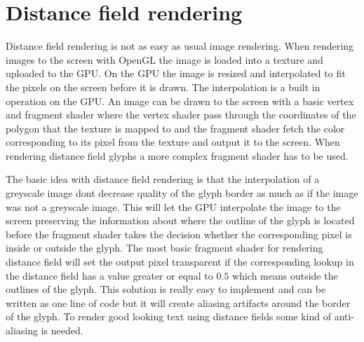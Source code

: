 \section{Distance field rendering}
Distance field rendering is not as easy as usual image rendering. When rendering images to the screen with OpenGL the image is loaded into a texture and uploaded to the GPU. On the GPU the image is resized and interpolated to fit the pixels on the screen before it is drawn. The interpolation is a built in operation on the GPU. An image can be drawn to the screen with a basic vertex and fragment shader where the vertex shader pass through the coordinates of the polygon that the texture is mapped to and the fragment shader fetch the color corresponding to its pixel from the texture and output it to the screen. When rendering distance field glyphs a more complex fragment shader has to be used.

The basic idea with distance field rendering is that the interpolation of a greyscale image dont decrease quality of the glyph border as much as if the image was not a greyscale image. This will let the GPU interpolate the image to the screen preserving the information about where the outline of the glyph is located before the fragment shader takes the decision whether the corresponding pixel is inside or outside the glyph. The most basic fragment shader for rendering distance field will set the output pixel transparent if the corresponding lookup in the distance field has a value greater or equal to $0.5$ which means outside the outlines of the glyph. This solution is really easy to implement and can be written as one line of code but it will create aliasing artifacts around the border of the glyph. To render good looking text using distance fields some kind of anti-aliasing is needed. 

